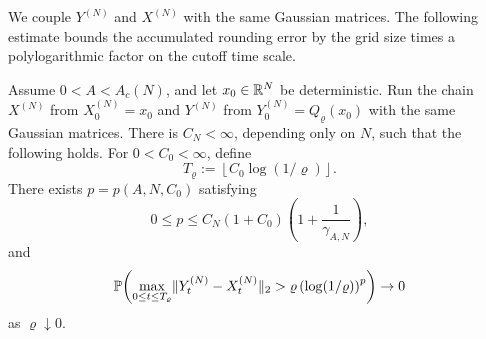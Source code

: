 \documentclass[11pt,reqno,a4paper]{article}
\newcommand{\Pp}{\P}
\begin{document}
We couple $Y^{(N)}$ and $X^{(N)}$ with the same Gaussian matrices. The
following estimate bounds the accumulated rounding error by the
grid size times a polylogarithmic factor on the cutoff time scale.
\begin{lemma}
\label{lem:rounded-gaussian-synchronous-comparison}
  Assume $0<A<A_c(N)$, and let $x_0\in\mathbb{R}^N$ be deterministic. Run the
  chain $X^{(N)}$ from $X_0^{(N)}=x_0$ and $Y^{(N)}$ from
  $Y_0^{(N)}=Q_\varrho(x_0)$ with the same Gaussian matrices.
  There is $C_N<\infty$, depending only on $N$, such that the following holds.
  For $0<C_0<\infty$, define
  \begin{equation*}
    T_\varrho:=\left\lfloor C_0\log(1/\varrho)\right\rfloor .
  \end{equation*}
  There exists $p=p(A,N,C_0)$ satisfying
  \begin{equation}\label{eq:rounded-gaussian-p-dependence}
    0
    \leq
    p
    \leq
    C_N(1+C_0)
    \left(
      1+\frac1{\gamma_{A,N}}
    \right),
  \end{equation}
  and
  \begin{equation}\label{eq:rounded-gaussian-coupling-input}
    \Pp\left(
      \max_{0\leq t\leq T_\varrho}
      \norm{Y_t^{(N)}-X_t^{(N)}}_2
      >
      \varrho\,\left(\log(1/\varrho)\right)^p
    \right)
    \to0
  \end{equation}
  as $\varrho\downarrow0$.
\end{lemma}
\end{document}
